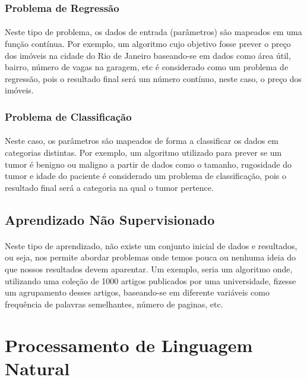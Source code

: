 \documentclass[grad,numbers]{coppe}
\begin{document}
  		\subsubsection{Problema de Regressão}
	  		\paragraph{}Neste tipo de problema, os dados de entrada (parâmetros) são mapeados em uma função contínua. Por exemplo, um algoritmo cujo objetivo fosse prever o preço dos imóveis na cidade do Rio de Janeiro baseando-se em dados como área útil, bairro, número de vagas na garagem, etc é considerado como um problema de regressão, pois o resultado final será um número contínuo, neste caso, o preço dos imóveis.
  		\subsubsection{Problema de Classificação}
  			\paragraph{}Neste caso, os parâmetros são mapeados de forma a classificar os dados em categorias distintas. Por exemplo, um algoritmo utilizado para prever se um tumor é benigno ou maligno a partir de dados como o tamanho, rugosidade do tumor e idade do paciente é considerado um problema de classificação, pois o resultado final será a categoria na qual o tumor pertence.
		\subsection{Aprendizado Não Supervisionado}
			\paragraph{}Neste tipo de aprendizado, não existe um conjunto inicial de dados e resultados, ou seja, nos permite abordar problemas onde temos pouca ou nenhuma ideia do que nossos resultados devem aparentar. Um exemplo, seria um algoritmo onde, utilizando uma coleção de 1000 artigos publicados por uma universidade, fizesse um agrupamento desses artigos, baseando-se em diferente variáveis como frequência de palavras semelhantes, número de paginas, etc.
  
  \section{Processamento de Linguagem Natural}
  	\paragraph{}
  
\end{document}
